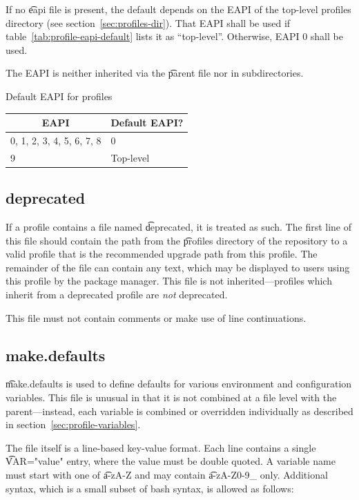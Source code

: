  If no \t{eapi} file is present, the default depends on the EAPI
of the top-level profiles directory (see section~\ref{sec:profiles-dir}). That EAPI shall be used
if table~\ref{tab:profile-eapi-default} lists it as ``top-level''. Otherwise, EAPI 0 shall be used.

The EAPI is neither inherited via the \t{parent} file nor in subdirectories.

\begin{centertable}{Default EAPI for profiles}
    \label{tab:profile-eapi-default}
    \begin{tabular}{ll}
      \toprule
      \multicolumn{1}{c}{\textbf{EAPI}} &
      \multicolumn{1}{c}{\textbf{Default EAPI?}} \\
      \midrule
      0, 1, 2, 3, 4, 5, 6, 7, 8 & 0         \\
      9                         & Top-level \\
      \bottomrule
    \end{tabular}
\end{centertable}

\subsection{deprecated}
If a profile contains a file named \t{deprecated}, it is treated as such. The first line of this
file should contain the path from the \t{profiles} directory of the repository to a valid profile
that is the recommended upgrade path from this profile. The remainder of the file can contain any
text, which may be displayed to users using this profile by the package manager. This file is not
inherited---profiles which inherit from a deprecated profile are \emph{not} deprecated.

This file must not contain comments or make use of line continuations.

\subsection{make.defaults}
\t{make.defaults} is used to define defaults for various environment and configuration variables.
This file is unusual in that it is not combined at a file level with the parent---instead, each
variable is combined or overridden individually as described in section~\ref{sec:profile-variables}.

The file itself is a line-based key-value format. Each line contains a single \t{VAR="value"}
entry, where the value must be double quoted. A variable name must start with one of \t{a-zA-Z}
and may contain \t{a-zA-Z0-9_} only. Additional syntax, which is a small subset of
bash syntax, is allowed as follows:

